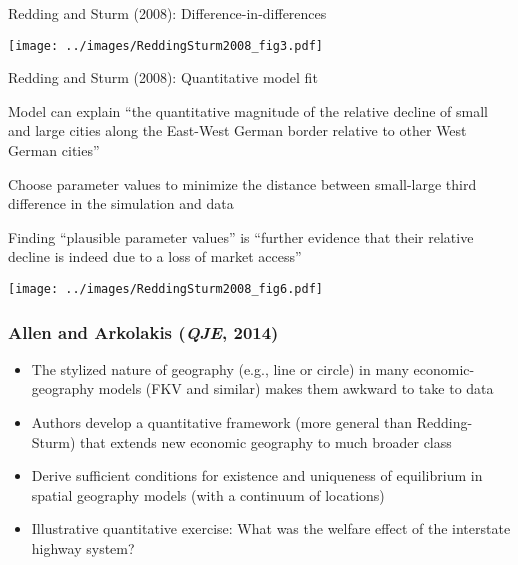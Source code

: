 \documentclass[10pt,notes=hide]{beamer}
\begin{document}
\begin{frame}{Redding and Sturm (2008): Difference-in-differences}
\begin{center}
\texttt{[image: ../images/ReddingSturm2008\_fig3.pdf]}
\end{center}
\end{frame}
\begin{frame}{Redding and Sturm (2008): Quantitative model fit}
\begin{itemize}
	{\small
	\item Model can explain ``the quantitative magnitude of the relative decline of small and large cities along the East-West German border relative to other West German cities''
	\item Choose parameter values to minimize the distance between small-large third difference in the simulation and data
	\item Finding ``plausible parameter values'' is ``further evidence that their relative decline is indeed due to a loss of market access''
	}
\end{itemize}
\begin{center}
\texttt{[image: ../images/ReddingSturm2008\_fig6.pdf]}
\end{center}
\end{frame}
\begin{frame}
\frametitle{Allen and Arkolakis (\textit{QJE}, 2014)}
\begin{itemize}
\item The stylized nature of geography (e.g., line or circle) in many economic-geography models (FKV and similar) makes them awkward to take to data
\item Authors develop a quantitative framework (more general than Redding-Sturm) that extends new economic geography to much broader class
\item Derive sufficient conditions for existence and uniqueness of equilibrium in spatial geography models (with a continuum of locations)
\item Illustrative quantitative exercise: What was the welfare effect of the interstate highway system?
\end{itemize}
\end{frame}
\end{document}
